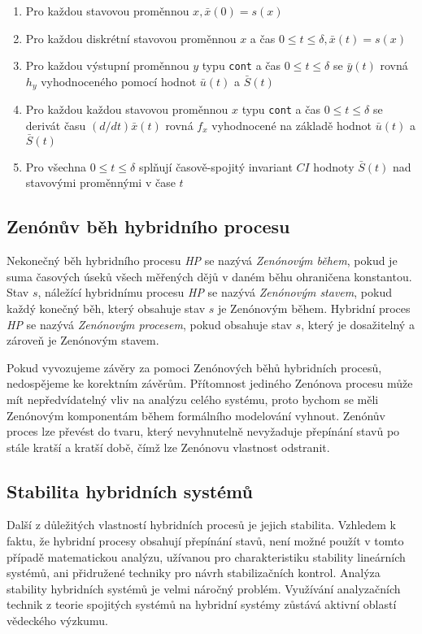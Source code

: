 \documentclass[conference,a4paper]{IEEEtran-CZ}
\begin{document}
\begin{enumerate}
  \item Pro každou stavovou proměnnou $x, \bar{x}(0) = s(x)$
  \item Pro každou diskrétní stavovou proměnnou $x$ a čas $0 \leq t \leq \delta, \bar{x}(t) = s(x)$
  \item Pro každou výstupní proměnnou $y$ typu \texttt{cont} a čas $0 \leq t \leq \delta$ se $\bar{y}(t)$ rovná $h_y$ vyhodnoceného pomocí
	hodnot $\bar{u}(t)$ a $\bar{S}(t)$
  \item Pro každou každou stavovou proměnnou $x$ typu \texttt{cont} a čas $0 \leq t \leq \delta$ se derivát času $(d/dt)\bar{x}(t)$ rovná 
	$f_x$ vyhodnocené na základě hodnot $\bar{u}(t)$ a $\bar{S}(t)$
  \item Pro všechna $0 \leq t \leq \delta$ splňují časově-spojitý invariant $CI$ hodnoty $\bar{S}(t)$ nad stavovými proměnnými v čase $t$
\end{enumerate}

\subsection{Zenónův běh hybridního procesu}

Nekonečný běh hybridního procesu \textit{HP} se nazývá \textit{Zenónovým během}, pokud je suma 
časových úseků všech měřených dějů v daném běhu ohraničena konstantou. Stav $s$, náležící
hybridnímu procesu \textit{HP} se nazývá \textit{Zenónovým stavem}, pokud každý konečný běh, 
který obsahuje stav $s$ je Zenónovým během. Hybridní proces \textit{HP} se nazývá 
\textit{Zenónovým procesem}, pokud obsahuje stav $s$, který je dosažitelný a zároveň je Zenónovým 
stavem.

Pokud vyvozujeme závěry za pomoci Zenónových běhů hybridních procesů, nedospějeme ke korektním závěrům. 
Přítomnost  jediného Zenónova procesu může mít nepředvídatelný vliv na analýzu celého systému, proto bychom
se měli Zenónovým komponentám  během formálního modelování vyhnout. Zenónův proces lze převést
do tvaru, který nevyhnutelně nevyžaduje přepínání stavů po stále kratší a kratší době, čímž lze Zenónovu
vlastnost odstranit.\cite{Rajeev:2015}

\subsection{Stabilita hybridních systémů}

Další z důležitých vlastností hybridních procesů je jejich stabilita. Vzhledem k faktu, že hybridní procesy
obsahují přepínání stavů, není možné použít v tomto případě matematickou analýzu, užívanou pro 
charakteristiku stability lineárních systémů, ani přidružené techniky pro návrh stabilizačních kontrol.
Analýza stability hybridních systémů je velmi náročný problém. Využívání analyzačních technik z teorie 
spojitých systémů na hybridní systémy zůstává aktivní oblastí vědeckého výzkumu.\cite{Rajeev:2015}
\end{document}
